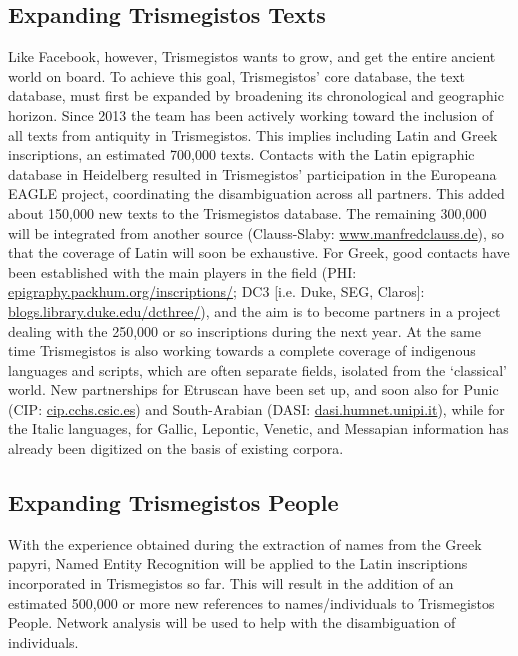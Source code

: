 \documentclass[amsthm,ebook]{saparticle}
\begin{document}
\subsection{Expanding Trismegistos Texts}


Like Facebook, however, Trismegistos wants to grow, and get the entire ancient world on board. To achieve this goal,
Trismegistos' core database, the text database, must first be expanded by broadening its chronological and geographic
horizon. Since 2013 the team has been actively working toward the inclusion of all texts from antiquity in
Trismegistos. This implies including Latin and Greek inscriptions, an estimated 700,000 texts. Contacts with the Latin
epigraphic database in Heidelberg resulted in Trismegistos' participation in the Europeana EAGLE project, coordinating
the disambiguation across all partners. This added about 150,000 new texts to the Trismegistos database. The remaining
300,000 will be integrated from another source (Clauss-Slaby: \url{www.manfredclauss.de}), so that the coverage of Latin will
soon be exhaustive. For Greek, good contacts have been established with the main players in the field (PHI:
\url{epigraphy.packhum.org/inscriptions/}; DC3 [i.e. Duke, SEG, Claros]: \url{blogs.library.duke.edu/dcthree/}), and the aim is to
become partners in a project dealing with the 250,000 or so inscriptions during the next year. At the same time
Trismegistos is also working towards a complete coverage of indigenous languages and scripts, which are often separate
fields, isolated from the `classical' world. New partnerships for Etruscan have been set up, and soon also for Punic
(CIP: \url{cip.cchs.csic.es}) and South-Arabian (DASI: \url{dasi.humnet.unipi.it}), while for the Italic languages, for Gallic,
Lepontic, Venetic, and Messapian information has already been digitized on the basis of existing corpora.




\subsection{Expanding Trismegistos People}


With the experience obtained during the extraction of names from the Greek papyri, Named Entity Recognition will be
applied to the Latin inscriptions incorporated in Trismegistos so far. This will result in the addition of an estimated
500,000 or more new references to names/individuals to Trismegistos People. Network analysis will be used to help with
the disambiguation of individuals.
\end{document}
